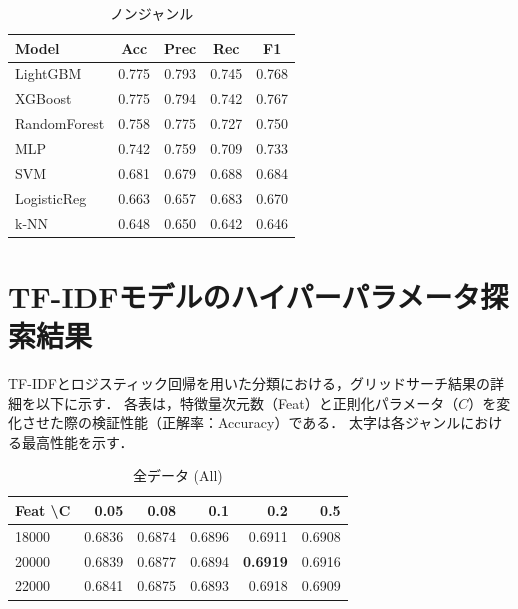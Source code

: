 \documentclass[uplatex, dvipdfmx, 11pt, a4paper, report]{jsbook}
\begin{document}
\begin{table}[H]
  \small
  \begin{minipage}[t]{0.49\textwidth}
    \centering
    \caption{ノンジャンル}
    \begin{tabular}{l|c|c|c|c} \hline
      Model & Acc & Prec & Rec & F1 \\ \hline
      LightGBM & 0.775 & 0.793 & 0.745 & 0.768 \\
      XGBoost & 0.775 & 0.794 & 0.742 & 0.767 \\
      RandomForest & 0.758 & 0.775 & 0.727 & 0.750 \\
      MLP & 0.742 & 0.759 & 0.709 & 0.733 \\
      SVM & 0.681 & 0.679 & 0.688 & 0.684 \\
      LogisticReg & 0.663 & 0.657 & 0.683 & 0.670 \\
      k-NN & 0.648 & 0.650 & 0.642 & 0.646 \\ \hline
    \end{tabular}
  \end{minipage}
  \hfill
  \begin{minipage}[t]{0.49\textwidth}
  \end{minipage}
\end{table}





\chapter{TF-IDFモデルのハイパーパラメータ探索結果}
\label{app:tfidf_grid}

TF-IDFとロジスティック回帰を用いた分類における，グリッドサーチ結果の詳細を以下に示す．
各表は，特徴量次元数（Feat）と正則化パラメータ（$C$）を変化させた際の検証性能（正解率：Accuracy）である．
太字は各ジャンルにおける最高性能を示す．

\begin{table}[H]
    \centering
    \small
    \caption{全データ (All)}
    \begin{tabular}{l|rrrrr}
        \hline
        Feat \textbackslash C & 0.05 & 0.08 & 0.1 & 0.2 & 0.5 \\ \hline
        18000 & 0.6836 & 0.6874 & 0.6896 & 0.6911 & 0.6908 \\
        20000 & 0.6839 & 0.6877 & 0.6894 & \textbf{0.6919} & 0.6916 \\
        22000 & 0.6841 & 0.6875 & 0.6893 & 0.6918 & 0.6909 \\ \hline
    \end{tabular}
\end{table}
\end{document}
